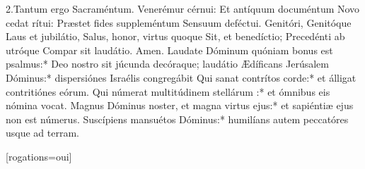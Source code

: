 \documentclass[%
fontsize=11%
,a5paper%
,DIV=15%
]{scrartcl}
\title{\centrer{\huge{Procession des Rogations}}}
\def\gretextformat#1{{\fontsize{\taillepolice}{\taillepolice}\selectfont #1}}
\def\greinitialformat#1{{\lettrines #1}}
\begin{document}
{2.Tantum ergo Sacraméntum.
Venerémur cérnui:
Et antíquum documéntum
Novo cedat rítui:
Præstet fides suppleméntum
Sensuum deféctui.
Genitóri, Genitóque
Laus et jubilátio,
Salus, honor, virtus quoque
Sit, et benedíctio;
Precedénti ab utróque
Compar sit laudátio. Amen.}
{Laudate Dóminum quóniam bonus est
psalmus:* Deo nostro sit júcunda decóraque;
laudátio
Ædíficans Jerúsalem Dóminus:* dispersiónes
Israélis congregábit
Qui sanat contrítos corde:* et álligat contritiónes
eórum.
Qui númerat multitúdinem stellárum :* et
ómnibus eis nómina vocat.
Magnus Dóminus noster, et magna virtus ejus:*
et sapiéntiæ ejus non est númerus.
Suscípiens mansuétos Dóminus:* humilíans
autem peccatóres usque ad terram.}


\maketitle
\thispagestyle{empty}
\pageblanche

        \newfontfamily{}
            \def\gretextformat#1{{\fontsize{\taillepolice}{\taillepolice}\selectfont #1}}
            \def\greinitialformat#1{{\lettrines #1}}

\newkeycommand{\litanies}[rogations=oui]{
}
\litanies[rogations=oui]{}
\end{document}
